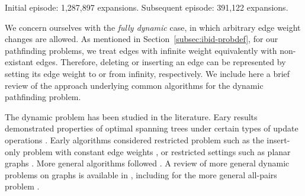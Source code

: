 \begin{marginfigure}%
   \centering%
   
   \caption{Initial episode: 1,287,897 expansions.
      Subsequent episode: 391,122 expansions.}%
   \label{fig:ibid:example-incremental}%
\end{marginfigure}

We concern ourselves with the \emph{fully dynamic} case,
in which arbitrary edge weight changes are allowed.
As mentioned in Section~\ref{subsec:ibid-probdef},
for our pathfinding problems,
we treat edges with infinite weight equivalently with non-existant
edges.
Therefore,
deleting or inserting an edge can be represented by
setting its edge weight to or from infinity, respectively.
We include here a brief review of the approach underlying common
algorithms for the dynamic pathfinding problem.

The dynamic problem has been studied in the literature.
Eary results demonstrated properties of optimal spanning trees
under certain types of update operations
\citep{spirapan1975updatingsp}.
Early algorithms considered restricted problem such as
the insert-only problem
with constant edge weights \citep{linchang1991dynamicsp},
or restricted settings such as planar graphs
\citep{klein1998planardynamicshort}.
More general algorithms followed
\citep{ramalingam1996dynamicswsffp,
   frigioni1996dynamicsinglesource,
   frigioni2000dynamicsp}.
A review of more general dynamic problems on graphs is available
in \citep{eppstein1999dynamic},
including for the more general all-pairs problem
\citep{demetrescu2010dynamic}.


